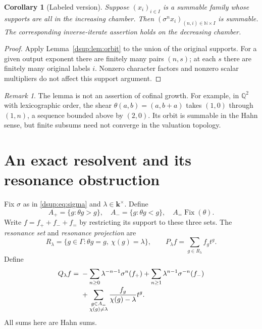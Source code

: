 \documentclass[11pt,oneside]{article}
\numberwithin{equation}{section}
\newtheorem{corollary}[theorem]{Corollary}
\theoremstyle{definition}
\theoremstyle{remark}
\newtheorem{remark}[theorem]{Remark}
\newcommand{\Q}{\mathbb Q}
\newcommand{\N}{\mathbb N}
\newcommand{\kk}{\mathbf k}
\newcommand{\Fix}{\operatorname{Fix}}
\begin{document}
\begin{corollary}[Labeled version]\label{dsup:cor:labeled}
Suppose $(x_i)_{i\in I}$ is a summable family whose supports are all in the
increasing chamber. Then $(\sigma^n x_i)_{(n,i)\in\N\times I}$ is summable.
The corresponding inverse-iterate assertion holds on the decreasing
chamber.
\end{corollary}
\begin{proof}
Apply Lemma~\ref{dsup:lem:orbit} to the union of the original supports. For a
given output exponent there are finitely many pairs $(n,s)$; at each $s$
there are finitely many original labels $i$. Nonzero character factors
and nonzero scalar multipliers do not affect this support argument.
\end{proof}

\begin{remark}
The lemma is not an assertion of cofinal growth. For example, in
$\Q^2$ with lexicographic order, the shear
$\theta(a,b)=(a,b+a)$ takes $(1,0)$ through $(1,n)$, a sequence bounded
above by $(2,0)$. Its orbit is summable in the Hahn sense, but finite
subsums need not converge in the valuation topology.
\end{remark}

\section{An exact resolvent and its resonance obstruction}\label{dsup:sec:resolvent}

Fix $\sigma$ as in \eqref{dsup:eq:sigma} and $\lambda\in\kk^\times$. Define
\[
 A_+=\{g:\theta g>g\},\quad A_-=\{g:\theta g<g\},\quad
 A_=\Fix(\theta).
\]
Write $f=f_++f_-+f_=$ by restricting its support to these three sets. The
\emph{resonance set} and \emph{resonance projection} are
\begin{equation}\label{dsup:eq:resonance}
 R_\lambda=\{g\in\Gamma:\theta g=g,\ \chi(g)=\lambda\},
 \qquad P_\lambda f=\sum_{g\in R_\lambda}f_gt^g.
\end{equation}
Define
\begin{align}
 Q_\lambda f={}&-\sum_{n\ge0}\lambda^{-n-1}\sigma^n(f_+)
        +\sum_{n\ge1}\lambda^{n-1}\sigma^{-n}(f_-)
 \notag\\[-2pt]
 &+\sum_{\substack{g\in A_=\\\chi(g)\ne\lambda}}
           \frac{f_g}{\chi(g)-\lambda}t^g .\label{dsup:eq:Q}
\end{align}
All sums here are Hahn sums.
\end{document}
